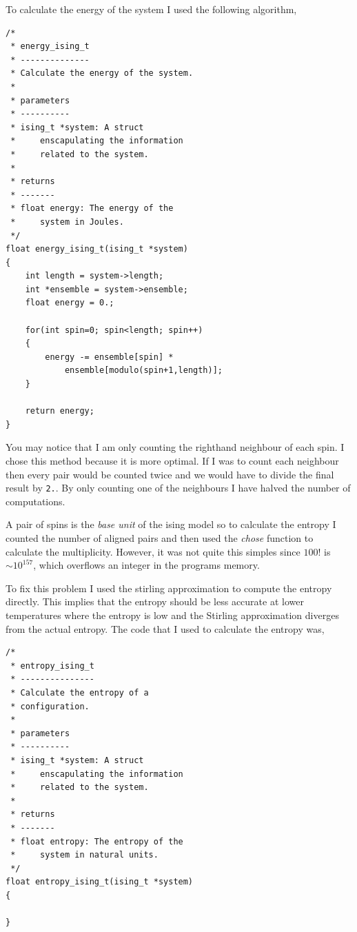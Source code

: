 \documentclass[a4paper, twocolumn]{article}
\begin{document}
To calculate the energy of the system I used the following %
algorithm, 

\begin{lstlisting}
/*
 * energy_ising_t
 * --------------
 * Calculate the energy of the system.
 *
 * parameters
 * ----------
 * ising_t *system: A struct 
 *     enscapulating the information 
 *     related to the system. 
 *
 * returns
 * -------
 * float energy: The energy of the
 *     system in Joules. 
 */
float energy_ising_t(ising_t *system)
{
    int length = system->length;
    int *ensemble = system->ensemble;
    float energy = 0.;

    for(int spin=0; spin<length; spin++)
    {
        energy -= ensemble[spin] *  
            ensemble[modulo(spin+1,length)];
    }

    return energy;
}
\end{lstlisting}


You may notice that I am only counting the righthand neighbour %
of each spin. I chose this method because it is more optimal. %
If I was to count each neighbour then every pair would be %
counted twice and we would have to divide the final result by %
\verb!2.!. By only counting one of the neighbours I have %
halved the number of computations. 


A pair of spins is the \emph{base unit} of the ising model %
so to calculate the entropy I counted the number of aligned %
pairs and then used the \emph{chose} function to calculate %
the multiplicity. However, it was not quite this simples %
since \(100!\) is \(\sim 10^{157}\), which overflows an %
integer in the programs memory. 


To fix this problem I used the stirling approximation to %
compute the entropy directly. This implies that the %
entropy should be less accurate at lower temperatures %
where the entropy is low and the Stirling approximation %
diverges from the actual entropy. The code that I used %
to calculate the entropy was,

\begin{lstlisting}
/*
 * entropy_ising_t
 * ---------------
 * Calculate the entropy of a 
 * configuration. 
 *
 * parameters
 * ----------
 * ising_t *system: A struct 
 *     enscapulating the information 
 *     related to the system. 
 *
 * returns
 * -------
 * float entropy: The entropy of the
 *     system in natural units. 
 */
float entropy_ising_t(ising_t *system)
{

}
\end{lstlisting}
\end{document}
